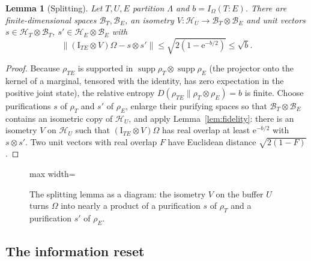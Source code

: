 \documentclass[aps,prx,reprint,superscriptaddress,floatfix,nofootinbib,longbibliography,amsmath,amssymb]{revtex4-2}
\newcommand{\id}{\mathrm{I}}
\newcommand{\supp}{\operatorname{supp}}
\newcommand{\norm}[1]{\lVert #1\rVert}
\newcommand{\cH}{\mathcal H}
\newcommand{\cB}{\mathcal B}
\newcommand{\Om}{\Omega}
\newcommand{\Lam}{\Lambda}
\newcommand{\e}{\mathrm e}
\theoremstyle{plain}
\newtheorem{lemma}[theorem]{Lemma}
\theoremstyle{definition}
\begin{document}
\begin{lemma}[Splitting]\label{lem:splitting}
Let $T,U,E$ partition $\Lam$ and $b=I_\Om(T:E)$. There are finite-dimensional
spaces $\cB_T,\cB_E$, an isometry $V:\cH_U\to\cB_T\otimes\cB_E$ and unit vectors
$s\in\cH_T\otimes\cB_T$, $s'\in\cH_E\otimes\cB_E$ with
\[
 \norm{(\id_{TE}\otimes V)\Om-s\otimes s'}\le\sqrt{2(1-\e^{-b/2})}\le\sqrt b .
\]
\end{lemma}
\begin{proof}
Because $\rho_{TE}$ is supported in $\supp\rho_T\otimes\supp\rho_E$ (the
projector onto the kernel of a marginal, tensored with the identity, has
zero expectation in the positive joint state), the relative entropy
$D(\rho_{TE}\|\rho_T\otimes\rho_E)=b$ is finite. Choose purifications $s$
of $\rho_T$ and $s'$ of $\rho_E$, enlarge their purifying spaces so that
$\cB_T\otimes\cB_E$ contains an isometric copy of $\cH_U$, and apply
Lemma~\ref{lem:fidelity}: there is an isometry $V$ on $\cH_U$ such that
$(\id_{TE}\otimes V)\Om$ has real overlap at least $\e^{-b/2}$ with
$s\otimes s'$. Two unit vectors with real overlap $F$ have Euclidean
distance $\sqrt{2(1-F)}$.
\end{proof}

\begin{figure}[t]
\centering
\begin{adjustbox}{max width=\linewidth}

\end{adjustbox}
\caption{The splitting lemma as a diagram: the isometry $V$ on the buffer $U$ turns $\Om$ into nearly a product of a purification $s$ of $\rho_T$ and a purification $s'$ of $\rho_E$.}\label{fig:split}
\end{figure}

\subsection{The information reset}\label{sec:reset}
\end{document}
